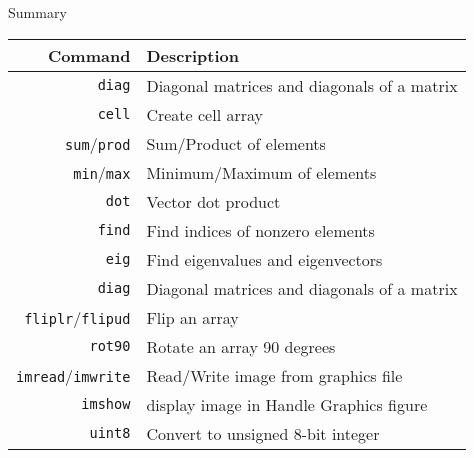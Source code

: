 \begin{frame}{Summary}
\protect\hypertarget{summary-1}{}
\begin{table}[!hbtp]
  \begin{tabular}{rl}
    Command                          & Description \\
    \hline
    \texttt{diag}                    & Diagonal matrices and diagonals of a matrix \\
    \texttt{cell}                    & Create cell array \\
    \texttt{sum}/\texttt{prod}       & Sum/Product of elements \\
    \texttt{min}/\texttt{max}        & Minimum/Maximum of elements \\
    \texttt{dot}                     & Vector dot product \\
    \texttt{find}                    & Find indices of nonzero elements \\
    \texttt{eig}                     & Find eigenvalues and eigenvectors \\
    \texttt{diag}                    & Diagonal matrices and diagonals of a matrix \\
    \texttt{fliplr}/\texttt{flipud}  & Flip an array \\
    \texttt{rot90}                   & Rotate an array 90 degrees \\
    \texttt{imread}/\texttt{imwrite} & Read/Write image from graphics file \\
    \texttt{imshow}                  & display image in Handle Graphics figure \\
    \texttt{uint8}                   & Convert to unsigned 8-bit integer \\
  \end{tabular}
\end{table}
\end{frame}

